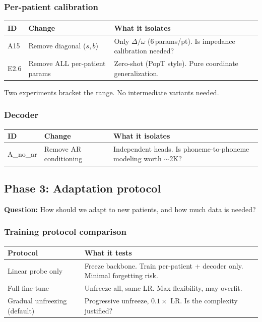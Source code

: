 \documentclass[11pt,letterpaper]{article}
\begin{document}
\subsubsection{Per-patient calibration}

\begin{table}[ht!]\centering\small
\begin{tabular}{@{}llp{5.5cm}@{}}
\toprule
\textbf{ID} & \textbf{Change} & \textbf{What it isolates} \\
\midrule
A15 & Remove diagonal ($s, b$) & Only $\Delta/\omega$ (6\,params/pt). Is impedance calibration needed? \\
E2.6 & Remove ALL per-patient params & Zero-shot (PopT style). Pure coordinate generalization. \\
\bottomrule
\end{tabular}
\end{table}

Two experiments bracket the range. No intermediate variants needed.

\subsubsection{Decoder}

\begin{table}[ht!]\centering\small
\begin{tabular}{@{}llp{5.5cm}@{}}
\toprule
\textbf{ID} & \textbf{Change} & \textbf{What it isolates} \\
\midrule
A\_no\_ar & Remove AR conditioning & Independent heads. Is phoneme-to-phoneme modeling worth ${\sim}$2K? \\
\bottomrule
\end{tabular}
\end{table}

\subsection{Phase 3: Adaptation protocol}\label{sec:phase3}

\textbf{Question:} How should we adapt to new patients, and how much data is needed?

\subsubsection{Training protocol comparison}

\begin{table}[ht!]\centering\small
\begin{tabular}{@{}lp{8cm}@{}}
\toprule
\textbf{Protocol} & \textbf{What it tests} \\
\midrule
Linear probe only & Freeze backbone. Train per-patient + decoder only. Minimal forgetting risk. \\
Full fine-tune & Unfreeze all, same LR. Max flexibility, may overfit. \\
Gradual unfreezing (default) & Progressive unfreeze, $0.1\times$ LR. Is the complexity justified? \\
\bottomrule
\end{tabular}
\end{table}
\end{document}

